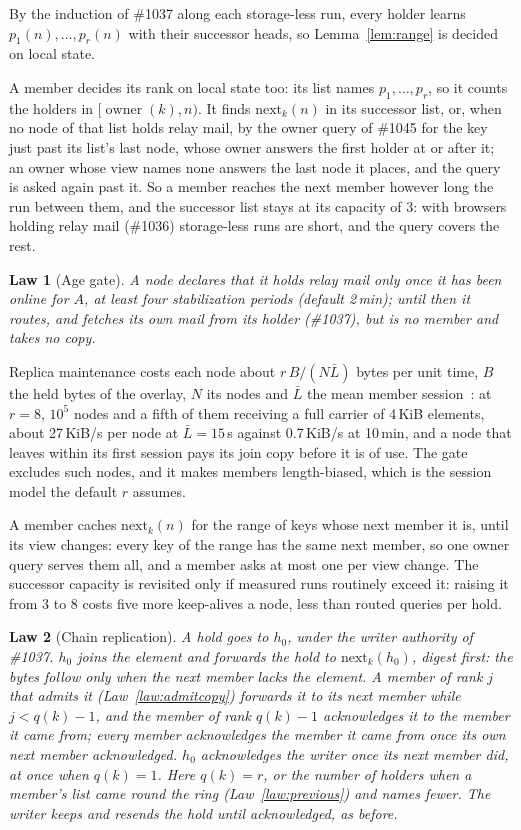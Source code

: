 \documentclass[journal]{IEEEtran}
\newtheorem{law}{Law}
\newcommand{\issue}[1]{\#{#1}}
\newcommand{\own}{\operatorname{owner}}
\begin{document}
By the induction of \issue{1037} along each storage-less run, every holder learns
$p_1(n),\dots,p_r(n)$ with their successor heads, so Lemma~\ref{lem:range} is decided on
local state.

A member decides its rank on local state too: its list names $p_1,\dots,p_r$, so it counts
the holders in $[\own(k),n)$.  It finds $\mathrm{next}_k(n)$ in its successor list, or, when no
node of that list holds relay mail, by the owner query of \issue{1045} for the key just past
its list's last node, whose owner answers the first holder at or after it; an owner whose view
names none answers the last node it places, and the query is asked again past it.  So a member
reaches the next member however long the run between them, and the successor list stays at its
capacity of 3: with browsers holding relay mail (\issue{1036}) storage-less runs are short, and
the query covers the rest.

\begin{law}[Age gate]\label{law:agegate}
A node declares that it holds relay mail only once it has been online for $A$, at least four
stabilization periods (default 2\,min); until then it routes, and fetches its own mail from its
holder (\issue{1037}), but is no member and takes no copy.
\end{law}

Replica maintenance costs each node about $r\,B/(N\bar L)$ bytes per unit time, $B$ the held
bytes of the overlay, $N$ its nodes and $\bar L$ the mean member session~\cite{BlakeRodrigues}: at $r=8$, $10^5$ nodes
and a fifth of them receiving a full carrier of 4\,KiB elements, about 27\,KiB/s per node at
$\bar L=15$\,s against 0.7\,KiB/s at 10\,min, and a node that leaves within its first session
pays its join copy before it is of use.  The gate excludes such nodes, and it makes members
length-biased, which is the session model the default $r$ assumes.

A member caches $\mathrm{next}_k(n)$ for the range of keys whose next member it is, until its
view changes: every key of the range has the same next member, so one owner query serves them
all, and a member asks at most one per view change.  The successor capacity is revisited only if
measured runs routinely exceed it: raising it from 3 to 8 costs five more keep-alives a node,
less than routed queries per hold.

\begin{law}[Chain replication]\label{law:fanout}
A hold goes to $h_0$, under the writer authority of \issue{1037}.  $h_0$ joins the element and
forwards the hold to $\mathrm{next}_k(h_0)$, digest first: the bytes follow only when the next
member lacks the element.  A member of rank $j$ that admits it
(Law~\ref{law:admitcopy}) forwards it to its next member while $j<q(k)-1$, and the member of
rank $q(k)-1$ acknowledges it to the member it came from; every member acknowledges the
member it came from once its own next member acknowledged.  $h_0$ acknowledges the writer once
its next member did, at once when $q(k)=1$.  Here $q(k)=r$, or the number of holders when a
member's list came round the ring (Law~\ref{law:previous}) and names fewer.  The writer keeps
and resends the hold until acknowledged, as before.
\end{law}
\end{document}
